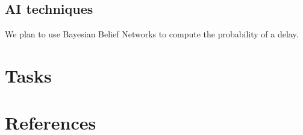 \documentclass[12pt]{article}
\begin{document}

\subsection{AI techniques}

We plan to use Bayesian Belief Networks to compute the probability of a delay.

\section{Tasks}


\section{References}

\end{document}
